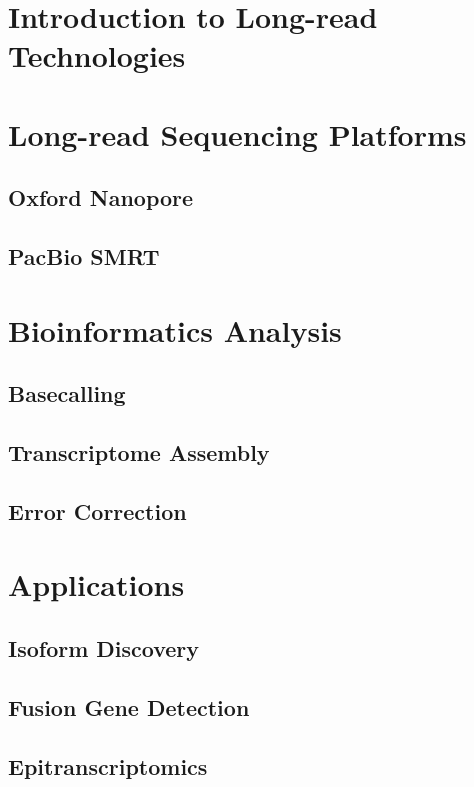 \documentclass[aspectratio=169]{beamer}
\subtitle{Long-reads Transcriptomics}
\author{Presenter Name}
\institute{Earlham Institute, Norwich, UK}
\date{\today}
\begin{document}
\begin{frame}[plain]
  \titlepage
\end{frame}

\tocframe

\section{Introduction to Long-read Technologies}

\section{Long-read Sequencing Platforms}
\subsection{Oxford Nanopore}
\subsection{PacBio SMRT}

\section{Bioinformatics Analysis}
\subsection{Basecalling}
\subsection{Transcriptome Assembly}
\subsection{Error Correction}

\section{Applications}
\subsection{Isoform Discovery}
\subsection{Fusion Gene Detection}
\subsection{Epitranscriptomics}
\end{document}

